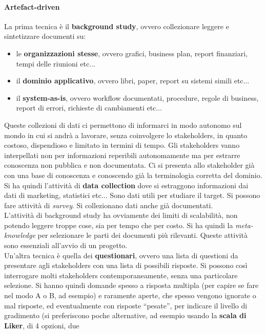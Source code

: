 \documentclass[a4paper,12pt, oneside]{book}
\begin{document}
\paragraph{Artefact-driven}
La prima tecnica è il \textbf{background study}, ovvero collezionare leggere e
sintetizzare documenti su:
\begin{itemize}
  \item le \textbf{organizzazioni stesse}, ovvero grafici, business plan, report
  finanziari, tempi delle riunioni etc$\ldots$
  \item il \textbf{dominio applicativo}, ovvero libri, paper, report su sistemi
  simili etc$\ldots$
  \item il \textbf{system-as-is}, ovvero workflow documentati, procedure, regole
  di business, report di errori, richieste di cambiamenti etc$\ldots$
\end{itemize}
Queste collezioni di dati ci permettono di informarci in modo autonomo sul mondo
in cui si andrà a lavorare, senza coinvolgere lo stakeholders, in quanto
costoso, dispendioso e limitato in termini di tempo. Gli stakeholders vanno
interpellati non per informazioni reperibili autonomamente ma per estrarre
conoscenza non pubblica e non documentata. Ci si presenta allo stakeholder già
con una base di conoscenza e conoscendo già la terminologia corretta del
dominio. \\
Si ha quindi l'attività di \textbf{data collection} dove si estraggono
informazioni dai dati di marketing, statistici etc$\ldots$ Sono dati utili per
studiare il target. Si possono fare attività di \textit{survey}. Si collezionano
dati anche già documentati.\\
L'attività di background study ha ovviamente dei limiti di scalabilità, non
potendo leggere troppe cose, sia per tempo che per costo. Si ha quindi la
\textit{meta-knowledge} per selezionare le parti dei documenti più
rilevanti. Queste attività sono essenziali all'avvio di un progetto.\\
Un'altra tecnica è quella dei \textbf{questionari}, ovvero una lista di
questioni da presentare agli stakeholders con una lista di possibili
risposte. Si possono così interrogare molti stakeholders contemporaneamente,
senza una particolare selezione. Si hanno quindi domande spesso a risposta
multipla (per capire se fare nel modo A o B, ad esempio) e raramente aperte,
che spesso vengono ignorate o mal risposte, ed eventualmente con risposte
``pesate'', per indicare il livello di gradimento (si preferiscono poche
alternative, ad esempio usando la \textbf{scala di Liker}, di 4 opzioni, due
\end{document}
